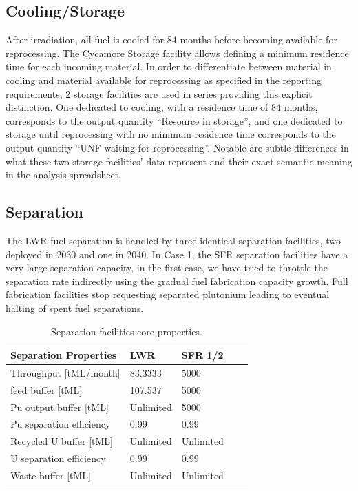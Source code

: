 \documentclass[12pt]{article}
\begin{document}
\subsection{Cooling/Storage}

After irradiation, all fuel is cooled for 84 months before becoming available
for reprocessing.  The Cycamore Storage facility allows defining a minimum
residence time for each incoming material.  In order to 
differentiate between material in cooling and material available for
reprocessing as specified in the reporting requirements, 
2 storage facilities are used in series providing this explicit
distinction. One dedicated to cooling, with a residence time of 84 months,
corresponds to the output quantity ``Resource in storage'', and
one dedicated to storage until reprocessing with no minimum residence time
corresponds to the output quantity ``UNF waiting for reprocessing''.
Notable are subtle differences in
what these two storage facilities' data represent and their exact semantic
meaning in the analysis spreadsheet.

\subsection{Separation}


The LWR fuel separation is handled by three identical separation facilities,
two deployed in 2030 and one in 2040. In Case 1, the SFR separation facilities have a
very large separation capacity, in the first case, we have tried to throttle
the separation rate indirectly using the gradual fuel fabrication capacity
growth. Full fabrication facilities stop requesting separated plutonium
leading to eventual halting of spent fuel separations.

\begin{table}[h!]
    \centering
    \begin{tabular}{lllll}
    \hline
    Separation Properties	&	LWR		&	SFR 1/2	\\
    \hline
    Throughput [tML/month]	&	83.3333	&	5000		\\
    feed buffer [tML]		&	107.537	&	5000		\\
    Pu output buffer [tML]	&	Unlimited	&	5000		\\
    Pu separation efficiency	&	0.99		&	0.99		\\
    Recycled U buffer [tML]	&	Unlimited	&	Unlimited	\\
    U separation efficiency	&	0.99		&	0.99		\\
    Waste buffer [tML]		&	Unlimited	&	Unlimited	\\
    \hline
    \end{tabular}
    \caption{Separation facilities core properties. }
    \label{tab:separation_1}
\end{table}
\end{document}
